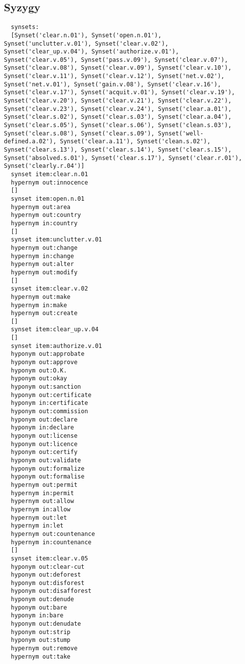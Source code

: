 \subsection{Syzygy}

\begin{multicols}{2}
  \begin{lstlisting}
  synsets:
  [Synset('clear.n.01'), Synset('open.n.01'), Synset('unclutter.v.01'), Synset('clear.v.02'), Synset('clear_up.v.04'), Synset('authorize.v.01'), Synset('clear.v.05'), Synset('pass.v.09'), Synset('clear.v.07'), Synset('clear.v.08'), Synset('clear.v.09'), Synset('clear.v.10'), Synset('clear.v.11'), Synset('clear.v.12'), Synset('net.v.02'), Synset('net.v.01'), Synset('gain.v.08'), Synset('clear.v.16'), Synset('clear.v.17'), Synset('acquit.v.01'), Synset('clear.v.19'), Synset('clear.v.20'), Synset('clear.v.21'), Synset('clear.v.22'), Synset('clear.v.23'), Synset('clear.v.24'), Synset('clear.a.01'), Synset('clear.s.02'), Synset('clear.s.03'), Synset('clear.a.04'), Synset('clear.s.05'), Synset('clear.s.06'), Synset('clean.s.03'), Synset('clear.s.08'), Synset('clear.s.09'), Synset('well-defined.a.02'), Synset('clear.a.11'), Synset('clean.s.02'), Synset('clear.s.13'), Synset('clear.s.14'), Synset('clear.s.15'), Synset('absolved.s.01'), Synset('clear.s.17'), Synset('clear.r.01'), Synset('clearly.r.04')]
  synset item:clear.n.01
  hypernym out:innocence
  []
  synset item:open.n.01
  hypernym out:area
  hypernym out:country
  hypernym in:country
  []
  synset item:unclutter.v.01
  hypernym out:change
  hypernym in:change
  hypernym out:alter
  hypernym out:modify
  []
  synset item:clear.v.02
  hypernym out:make
  hypernym in:make
  hypernym out:create
  []
  synset item:clear_up.v.04
  []
  synset item:authorize.v.01
  hyponym out:approbate
  hyponym out:approve
  hyponym out:O.K.
  hyponym out:okay
  hyponym out:sanction
  hyponym out:certificate
  hyponym in:certificate
  hyponym out:commission
  hyponym out:declare
  hyponym in:declare
  hyponym out:license
  hyponym out:licence
  hyponym out:certify
  hyponym out:validate
  hyponym out:formalize
  hyponym out:formalise
  hypernym out:permit
  hypernym in:permit
  hypernym out:allow
  hypernym in:allow
  hypernym out:let
  hypernym in:let
  hypernym out:countenance
  hypernym in:countenance
  []
  synset item:clear.v.05
  hyponym out:clear-cut
  hyponym out:deforest
  hyponym out:disforest
  hyponym out:disafforest
  hyponym out:denude
  hyponym out:bare
  hyponym in:bare
  hyponym out:denudate
  hyponym out:strip
  hyponym out:stump
  hypernym out:remove
  hypernym out:take

\end{lstlisting}
\end{multicols}
